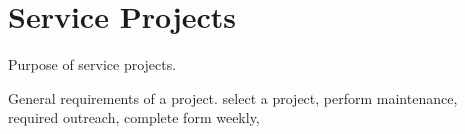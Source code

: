 \documentclass[letterpaper,10pt]{memoir}
\begin{document}


\newpage
\section*{Service Projects}

Purpose of service projects.

General requirements of a project.
select a project,
perform maintenance,
required outreach,
complete form weekly,



\newpage
\end{document}
